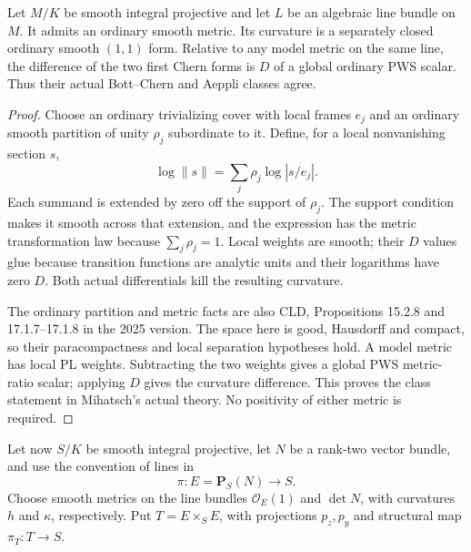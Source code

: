 \begin{lemma}
\label{r15b:smooth-line-metrics}
Let $M/K$ be smooth integral projective and let $L$ be an
algebraic line bundle on $M$. It admits an ordinary smooth
metric. Its curvature is a separately closed ordinary smooth
$(1,1)$ form. Relative to any model metric on the same line,
the difference of the two first Chern forms is $D$ of a global
ordinary PWS scalar. Thus their actual Bott--Chern and Aeppli
classes agree.
\end{lemma}

\begin{proof}
Choose an ordinary trivializing cover with local frames $e_j$
and an ordinary smooth partition of unity $\rho_j$ subordinate
to it. Define, for a local nonvanishing section $s$,
\[
                    \log\|s\|=\sum_j\rho_j\log|s/e_j|.
\tag{PB15.1}\label{r15b:smooth-metric-formula}
\]
Each summand is extended by zero off the support of $\rho_j$.
The support condition makes it smooth across that extension,
and the expression has the metric transformation law because
$\sum_j\rho_j=1$. Local weights are smooth; their $D$ values
glue because transition functions are analytic units and their
logarithms have zero $D$. Both actual differentials kill the
resulting curvature.

The ordinary partition and metric facts are also CLD,
Propositions 15.2.8 and 17.1.7--17.1.8 in the 2025 version.
The space here is good, Hausdorff and compact, so their
paracompactness and local separation hypotheses hold.
A model metric has local PL weights. Subtracting the two
weights gives a global PWS metric-ratio scalar; applying $D$
gives the curvature difference. This proves the class statement
in Mihatsch's actual theory. No positivity of either metric
is required.
\end{proof}

Let now $S/K$ be smooth integral projective, let $N$ be a
rank-two vector bundle, and use the convention of lines in
\[
                \pi:E=\mathbf P_S(N)\longrightarrow S.
\]
Choose smooth metrics on the line bundles
$\mathcal O_E(1)$ and $\det N$, with curvatures $h$ and $\kappa$,
respectively. Put $T=E\times_S E$, with projections $p_z,p_y$
and structural map $\pi_T:T\to S$.

